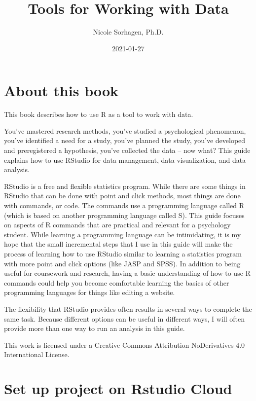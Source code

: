 \documentclass[
]{book}
\title{Tools for Working with Data}
\author{Nicole Sorhagen, Ph.D.}
\date{2021-01-27}
\begin{document}
\maketitle

{
\setcounter{tocdepth}{1}
\tableofcontents
}
\hypertarget{about-this-book}{%
\chapter{About this book}\label{about-this-book}}

This book describes how to use R as a tool to work with data.

You've mastered research methods, you've studied a psychological phenomenon, you've identified a need for a study, you've planned the study, you've developed and preregistered a hypothesis, you've collected the data -- now what? This guide explains how to use RStudio for data management, data visualization, and data analysis.

RStudio is a free and flexible statistics program. While there are some things in RStudio that can be done with point and click methods, most things are done with commands, or code. The commands use a programming language called R (which is based on another programming language called S). This guide focuses on aspects of R commands that are practical and relevant for a psychology student. While learning a programming language can be intimidating, it is my hope that the small incremental steps that I use in this guide will make the process of learning how to use RStudio similar to learning a statistics program with more point and click options (like JASP and SPSS). In addition to being useful for coursework and research, having a basic understanding of how to use R commands could help you become comfortable learning the basics of other programming languages for things like editing a website.

The flexibility that RStudio provides often results in several ways to complete the same task. Because different options can be useful in different ways, I will often provide more than one way to run an analysis in this guide.

This work is licensed under a Creative Commons Attribution-NoDerivatives 4.0 International License.

\hypertarget{set-up-project-on-rstudio-cloud}{%
\chapter{Set up project on Rstudio Cloud}\label{set-up-project-on-rstudio-cloud}}
\end{document}
